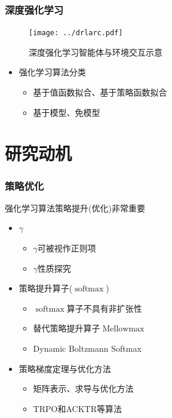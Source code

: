 \documentclass{beamer}
\begin{document}
\begin{CJK*}{GBK}{hei}
\begin{frame}\frametitle{深度强化学习}
    \begin{figure}[htbp]
       \centering\texttt{[image: ../drlarc.pdf]}
	   \caption{深度强化学习智能体与环境交互示意}
    \end{figure}
\begin{itemize}
\item 强化学习算法分类
{
\begin{itemize}
\item 基于值函数拟合、基于策略函数拟合
\item 基于模型、免模型
\end{itemize}
}
\end{itemize}
\end{frame}

\section{研究动机}

\begin{frame}\frametitle{策略优化}
强化学习算法策略提升(优化)非常重要
\begin{itemize}
\item $\gamma$
{
\begin{itemize}
    \item $\gamma$可被视作正则项\citep{Amit2020DiscountFA}
    \item $\gamma$性质探究\citep{Pitis2019RethinkingTD}
\end{itemize}
}
\item 策略提升算子($\operatorname{softmax}$)
{
\begin{itemize}
    \item $\operatorname{softmax}$算子不具有非扩张性\citep{Littman1996AGR}
    \item 替代策略提升算子$\operatorname{Mellowmax}$\citep{Asadi2017AnAS}
    \item Dynamic Boltzmann Softmax\citep{Pan2019ReinforcementLW}
\end{itemize}
}
\item 策略梯度定理与优化方法
{
\begin{itemize}
    \item 矩阵表示、求导与优化方法
    \item TRPO\citep{Schulman2015TrustRP}和ACKTR\citep{Wu2017ScalableTM}等算法
\end{itemize}
}
\end{itemize}
\end{frame}


\end{CJK*}
\end{document}
